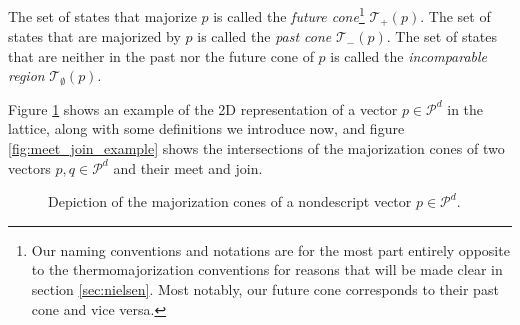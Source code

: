 \begin{definition}
    The set of states that majorize $p$ is called the \textit{future cone}\footnote{Our naming conventions and notations are for the most part entirely opposite to the thermomajorization conventions for reasons that will be made clear in section \ref{sec:nielsen}. Most notably, our future cone corresponds to their past cone and vice versa.}  $\mathcal{T}_+ (p)$. The set of states that are majorized by $p$ is called the \textit{past cone} $\mathcal{T}_- (p)$. The set of states that are neither in the past nor the future cone of $p$ is called the \textit{incomparable region} $\mathcal{T}_\emptyset (p)$.
\end{definition}

Figure \ref{fig:maj_cones_example} shows an example of the 2D representation of a vector $p \in \mathcal{P}^d$ in the lattice, along with some definitions we introduce now, and figure \ref{fig:meet_join_example} shows the intersections of the majorization cones of two vectors $p, q \in \mathcal{P}^d$ and their meet and join.

\begin{figure}[h!]
    \centering
    \caption{Depiction of the majorization cones of a nondescript vector $p \in \mathcal{P}^d$.}
    \label{fig:maj_cones_example}
\end{figure}

